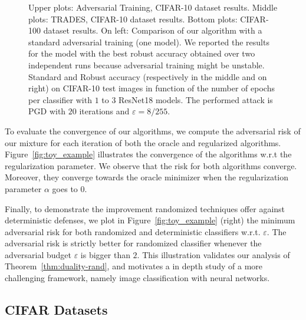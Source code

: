 \begin{figure}[!ht]
\begin{center}
 \caption{Upper plots: Adversarial Training, CIFAR-10 dataset results. Middle plots:  TRADES, CIFAR-10 dataset results. Bottom plots: CIFAR-100 dataset results. {On left}: Comparison of our algorithm with a standard adversarial training (one model). We reported the results for the model with the best robust accuracy obtained over two independent runs because adversarial training might be unstable. Standard and Robust accuracy (respectively in the middle and on right) on CIFAR-10 test images in function of the number of epochs per classifier with $1$ to $3$ ResNet18 models. The performed attack is PGD with $20$ iterations and $\varepsilon=8/255$.}
\label{fig:results_cifar}

\end{center}
\end{figure}

To evaluate the convergence of our algorithms, we compute the adversarial risk of our mixture for each iteration of both the oracle and regularized algorithms. Figure~\ref{fig:toy_example} illustrates the convergence of the algorithms w.r.t the regularization parameter. We observe that the risk for both algorithms converge. Moreover, they converge towards the oracle minimizer when the regularization parameter $\alpha$ goes to $0$.

Finally, to demonstrate the improvement randomized techniques offer against deterministic defenses, we plot in Figure~\ref{fig:toy_example} (right) the minimum adversarial risk for both randomized and deterministic classifiers w.r.t. $\varepsilon$. The adversarial risk is strictly better for randomized classifier whenever the adversarial budget $\varepsilon$ is bigger than $2$. This illustration validates our analysis of Theorem~\ref{thm:duality-rand}, and motivates a in depth study of a more challenging framework, namely image classification with neural networks.


\subsection{CIFAR Datasets}


